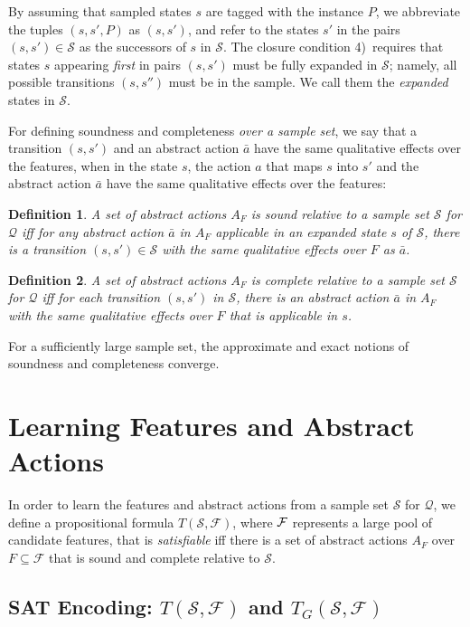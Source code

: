 \documentclass[letterpaper]{article} %
\newtheorem{definition}{Definition}
\newcommand{\Q}{\mathcal{Q}}
\newcommand{\F}{\mathcal{F}}
\renewcommand{\S}{\mathcal{S}}
\begin{document}
By assuming that sampled states $s$ are tagged with the instance $P$,
we abbreviate the tuples $(s,s',P)$ as $(s,s')$, and refer to the
states $s'$ in  the pairs $(s,s') \in \S$ as the successors of
$s$ in $\S$. The  closure condition 4)~requires that
states $s$ appearing \emph{first} in pairs $(s,s')$ must be fully expanded in $\S$;
namely, all possible transitions $(s,s'')$ must be  in the sample. We call them
the \emph{expanded} states in $\S$.

For defining soundness and completeness \emph{over a sample set}, we say that  a transition $(s,s')$ and an abstract action $\bar{a}$
have  the same qualitative effects over the features,   when in the  state $s$,  the action $a$ that maps $s$ into $s'$ and the abstract action
$\bar{a}$ have the same qualitative effects over the features:

\begin{definition}
  A set of abstract actions $A_F$ is sound \emph{relative to a  sample set} $\S$ for $\Q$
  iff for  any  abstract action $\bar{a}$ in $A_F$ applicable in an expanded state $s$ of $\S$,
  there is a transition $(s,s') \in \S$ with the same qualitative  effects over $F$ as $\bar{a}$.
\end{definition}

\begin{definition}
  A set of abstract actions $A_F$ is complete   \emph{relative to a sample set} $\S$ for $\Q$
  iff for each transition  $(s,s')$ in  $\S$, there is an abstract action $\bar{a}$ in $A_F$
  with the same qualitative effects over $F$ that is applicable in $s$.
\end{definition}

For a sufficiently large sample set, the approximate and exact notions of soundness and completeness   converge.


\section{Learning Features and Abstract Actions}

In order to learn the features and abstract actions from a sample set $\S$ for $\Q$,
we define a propositional formula $T(\S,\F)$, where  $\cal F$ represents a large
pool of candidate features, that is \emph{satisfiable} iff there is
a set of abstract actions $A_F$ over  $F \subseteq \F$ that is sound and complete
relative to $\S$.

\subsection{SAT Encoding: $T(\S,\F)$ and $T_G(\S,\F)$}
\end{document}
